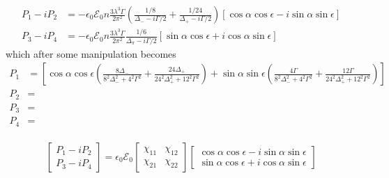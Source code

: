 \documentclass[11pt,letter]{article}
\newcommand{\efieldo}{\ensuremath{\mathcal{E}_{0}}}
\begin{document}
\begin{equation}
\begin{split}
  P_{1} - i P_{2} & = -\epsilon_{0} \efieldo n 
       \frac{ 3 \lambda^{3}\Gamma}{2 \pi^{2}} 
       \left( \frac{1/8}{\Delta_{-} - i \Gamma/2 } 
       +  \frac{1/24}{\Delta_{+} - i \Gamma/2 }  \right)  
      [\cos\alpha \cos \epsilon - i \sin\alpha\sin\epsilon] \\
  P_{3} - i P_{4} & = -\epsilon_{0} \efieldo n 
       \frac{ 3 \lambda^{3}\Gamma}{2 \pi^{2}} 
              \frac{1/6}{\Delta_{\pi} - i \Gamma/2 } 
      [\sin\alpha \cos\epsilon + i \cos\alpha\sin\epsilon]
\end{split}
\end{equation}
which after some manipulation becomes
\begin{equation}
\begin{split}
  P_{1} &=  \left[
             \cos\alpha\cos\epsilon \left( 
             \frac{8\Delta_{-}}{8^{2}\Delta_{-}^{2} + 4^{2} \Gamma^{2}} 
            +\frac{24\Delta_{+}}{24^{2}\Delta_{+}^{2} + 12^{2}\Gamma^{2}} 
             \right) 
          +  \sin\alpha\sin\epsilon \left(
             \frac{4\Gamma}{ 8^{2}\Delta_{-}^{2} + 4^{2}\Gamma^{2}} 
            +\frac{12\Gamma}{ 24^{2}\Delta_{+}^{2} + 12^{2}\Gamma^{2} } 
             \right)
            \right] \\
  P_{2} &= \\ 
  P_{3} &= \\
  P_{4} &= \\ 
\end{split}
\end{equation} 

\begin{equation}
 \left[ \begin{matrix}  P_{1}-iP_{2} \\ P_{3}-iP_{4} \end{matrix} \right]
  =  \epsilon_{0}\efieldo 
 \left[ \begin{matrix}
     \chi_{11} & \chi_{12} \\ \chi_{21} & \chi_{22} 
 \end{matrix} \right]
 \left[ \begin{matrix}
      \cos\alpha \cos \epsilon - i \sin\alpha\sin\epsilon \\
      \sin\alpha \cos\epsilon + i \cos\alpha\sin\epsilon
 \end{matrix} \right]
\end{equation}
\end{document}

